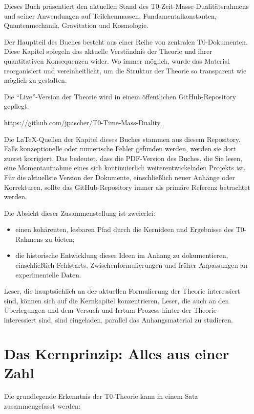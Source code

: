 	Dieses Buch präsentiert den aktuellen Stand des T0-Zeit-Masse-Dualitätsrahmens und seiner Anwendungen auf Teilchenmassen, Fundamentalkonstanten, Quantenmechanik, Gravitation und Kosmologie.
	
	Der Hauptteil des Buches besteht aus einer Reihe von zentralen T0-Dokumenten. Diese Kapitel spiegeln das aktuelle Verständnis der Theorie und ihrer quantitativen Konsequenzen wider. Wo immer möglich, wurde das Material reorganisiert und vereinheitlicht, um die Struktur der Theorie so transparent wie möglich zu gestalten.
	
	Die ``Live''-Version der Theorie wird in einem öffentlichen GitHub-Repository gepflegt:
	\begin{center}
		\url{https://github.com/jpascher/T0-Time-Mass-Duality}
	\end{center}
	
	Die \LaTeX{}-Quellen der Kapitel dieses Buches stammen aus diesem Repository. Falls konzeptionelle oder numerische Fehler gefunden werden, werden sie dort zuerst korrigiert. Das bedeutet, dass die PDF-Version des Buches, die Sie lesen, eine Momentaufnahme eines sich kontinuierlich weiterentwickelnden Projekts ist. Für die aktuellste Version der Dokumente, einschließlich neuer Anhänge oder Korrekturen, sollte das GitHub-Repository immer als primäre Referenz betrachtet werden.
	
	Die Absicht dieser Zusammenstellung ist zweierlei:
	\begin{itemize}
		\item einen kohärenten, lesbaren Pfad durch die Kernideen und Ergebnisse des T0-Rahmens zu bieten;
		\item die historische Entwicklung dieser Ideen im Anhang zu dokumentieren, einschließlich Fehlstarts, Zwischenformulierungen und früher Anpassungen an experimentelle Daten.
	\end{itemize}
	
	Leser, die hauptsächlich an der aktuellen Formulierung der Theorie interessiert sind, können sich auf die Kernkapitel konzentrieren. Leser, die auch an den Überlegungen und dem Versuch-und-Irrtum-Prozess hinter der Theorie interessiert sind, sind eingeladen, parallel das Anhangsmaterial zu studieren.
	
	\section{Das Kernprinzip: Alles aus einer Zahl}
	Die grundlegende Erkenntnis der T0-Theorie kann in einem Satz zusammengefasst werden:
	
